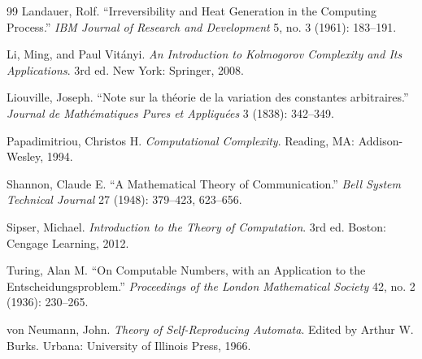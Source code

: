 \documentclass[11pt,openany]{book}
\begin{document}
\begin{thebibliography}{99}
Landauer, Rolf.
\newblock ``Irreversibility and Heat Generation in the Computing Process.''
\newblock \emph{IBM Journal of Research and Development} 5, no. 3 (1961): 183--191.

Li, Ming, and Paul Vitányi.
\newblock \emph{An Introduction to Kolmogorov Complexity and Its Applications}.
\newblock 3rd ed. New York: Springer, 2008.

Liouville, Joseph.
\newblock ``Note sur la théorie de la variation des constantes arbitraires.''
\newblock \emph{Journal de Mathématiques Pures et Appliquées} 3 (1838): 342--349.

Papadimitriou, Christos H.
\newblock \emph{Computational Complexity}.
\newblock Reading, MA: Addison-Wesley, 1994.

Shannon, Claude E.
\newblock ``A Mathematical Theory of Communication.''
\newblock \emph{Bell System Technical Journal} 27 (1948): 379--423, 623--656.

Sipser, Michael.
\newblock \emph{Introduction to the Theory of Computation}.
\newblock 3rd ed. Boston: Cengage Learning, 2012.

Turing, Alan M.
\newblock ``On Computable Numbers, with an Application to the Entscheidungsproblem.''
\newblock \emph{Proceedings of the London Mathematical Society} 42, no. 2 (1936): 230--265.

von Neumann, John.
\newblock \emph{Theory of Self-Reproducing Automata}.
\newblock Edited by Arthur W. Burks. Urbana: University of Illinois Press, 1966.

\end{thebibliography}
\end{document}
